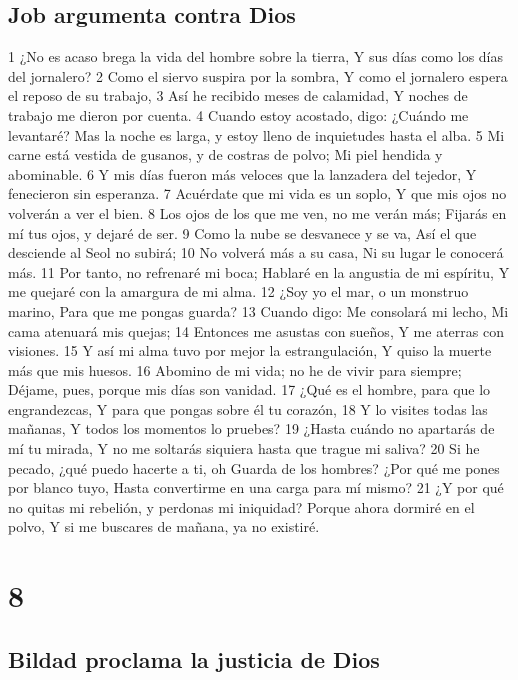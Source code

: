 \section*{Job argumenta contra Dios}

1 ¿No es acaso brega la vida del hombre sobre la tierra,
Y sus días como los días del jornalero?
2 Como el siervo suspira por la sombra,
Y como el jornalero espera el reposo de su trabajo, 
3 Así he recibido meses de calamidad,
Y noches de trabajo me dieron por cuenta.
4 Cuando estoy acostado, digo: ¿Cuándo me levantaré?
Mas la noche es larga, y estoy lleno de inquietudes hasta el alba. 
5 Mi carne está vestida de gusanos, y de costras de polvo;
Mi piel hendida y abominable.
6 Y mis días fueron más veloces que la lanzadera del tejedor,
Y fenecieron sin esperanza.
7 Acuérdate que mi vida es un soplo,
Y que mis ojos no volverán a ver el bien.
8 Los ojos de los que me ven, no me verán más;
Fijarás en mí tus ojos, y dejaré de ser.
9 Como la nube se desvanece y se va,
Así el que desciende al Seol no subirá;
10 No volverá más a su casa,
Ni su lugar le conocerá más.
11 Por tanto, no refrenaré mi boca;
Hablaré en la angustia de mi espíritu,
Y me quejaré con la amargura de mi alma.
12 ¿Soy yo el mar, o un monstruo marino,
Para que me pongas guarda?
13 Cuando digo: Me consolará mi lecho,
Mi cama atenuará mis quejas; 
14 Entonces me asustas con sueños,
Y me aterras con visiones.
15 Y así mi alma tuvo por mejor la estrangulación,
Y quiso la muerte más que mis huesos.
16 Abomino de mi vida; no he de vivir para siempre;
Déjame, pues, porque mis días son vanidad.
17 ¿Qué es el hombre, para que lo engrandezcas,
Y para que pongas sobre él tu corazón, 
18 Y lo visites todas las mañanas,
Y todos los momentos lo pruebes?
19 ¿Hasta cuándo no apartarás de mí tu mirada,
Y no me soltarás siquiera hasta que trague mi saliva?
20 Si he pecado, ¿qué puedo hacerte a ti, oh Guarda de los hombres?
¿Por qué me pones por blanco tuyo,
Hasta convertirme en una carga para mí mismo?
21 ¿Y por qué no quitas mi rebelión, y perdonas mi iniquidad?
Porque ahora dormiré en el polvo,
Y si me buscares de mañana, ya no existiré.

\chapter{8}

\section*{Bildad proclama la justicia de Dios}

